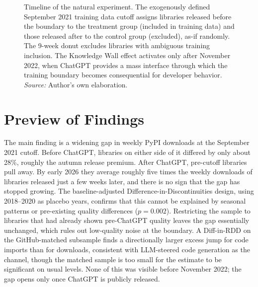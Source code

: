 \documentclass[12pt, a4paper]{report}
\begin{document}
\begin{figure}[ht]
{%
}
\caption{Timeline of the natural experiment. The exogenously defined September 2021 training data cutoff assigns libraries released before the boundary to the treatment group (included in training data) and those released after to the control group (excluded), as-if randomly. The 9-week donut excludes libraries with ambiguous training inclusion. The Knowledge Wall effect activates only after November 2022, when ChatGPT provides a mass interface through which the training boundary becomes consequential for developer behavior. \textit{Source:} Author's own elaboration.}\label{fig:timeline}
\end{figure}

\section{Preview of Findings}\label{sec:intro-preview}
The main finding is a widening gap in weekly PyPI downloads at the September 2021 cutoff. Before ChatGPT, libraries on either side of it differed by only about 28\%, roughly the autumn release premium. After ChatGPT, pre-cutoff libraries pull away. By early 2026 they average roughly five times the weekly downloads of libraries released just a few weeks later, and there is no sign that the gap has stopped growing. The baseline-adjusted Difference-in-Discontinuities design, using 2018--2020 as placebo years, confirms that this cannot be explained by seasonal patterns or pre-existing quality differences ($p = 0.002$). Restricting the sample to libraries that had already shown pre-ChatGPT quality leaves the gap essentially unchanged, which rules out low-quality noise at the boundary. A Diff-in-RDD on the GitHub-matched subsample finds a directionally larger excess jump for code imports than for downloads, consistent with LLM-steered code generation as the channel, though the matched sample is too small for the estimate to be significant on usual levels. None of this was visible before November 2022; the gap opens only once ChatGPT is publicly released.
\end{document}
